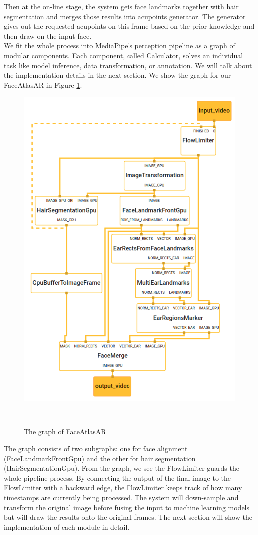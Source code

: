 Then at the on-line stage, the system gets face landmarks together with hair segmentation and merges those results into acupoints generator. The generator gives out the requested acupoints on this frame based on the prior knowledge and then draw on the input face.\\
We fit the whole process into MediaPipe’s perception pipeline as a graph of modular components. Each component, called Calculator, solves an individual task like model inference, data transformation, or annotation. We will talk about the implementation details in the next section. We show the graph for our FaceAtlasAR in Figure  \ref{fig:graph_main}.\\
\begin{figure}
\centering
  \includegraphics[width=\columnwidth]{figures/graph_main.png}
  \caption{The graph of FaceAtlasAR}~\label{fig:graph_main}
\end{figure}
The graph consists of two subgraphs: one for face alignment (FaceLandmarkFrontGpu) and the other for hair segmentation (HairSegmentationGpu). From the graph, we see the FlowLimiter guards the whole pipeline process. By connecting the output of the final image to the FlowLimiter with a backward edge, the FlowLimiter keeps track of how many timestamps are currently being processed. The system will down-sample and transform the original image before fusing the input to machine learning models but will draw the results onto the original frames. The next section will show the implementation of each module in detail.

